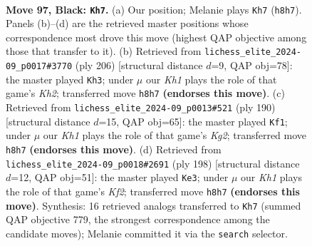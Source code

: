 \documentclass[11pt]{article}
\begin{document}
\clearpage

\begin{figure}[p]\centering
\begin{subfigure}{0.46\textwidth}\centering
\resizebox{\linewidth}{!}{%
\newchessgame
\chessboard[
  setfen={1R5k/6p1/5p2/7p/7P/6PK/2Nr4/8 b - - 19 97},
  showmover=false,
  pgfstyle=straightmove, color=movearrow, markmove={h8-h7}
]}
\caption{}
\end{subfigure}\hfill
\begin{subfigure}{0.46\textwidth}\centering
\resizebox{\linewidth}{!}{%
\newchessgame
\chessboard[
  setfen={8/5R2/6pk/7p/7P/6P1/1r5K/8 w - - 44 104},
  showmover=false,
  pgfstyle=straightmove, color=movearrow, markmove={h2-h3}
]}
\caption{}
\end{subfigure}
\\[4pt]
\begin{subfigure}{0.46\textwidth}\centering
\resizebox{\linewidth}{!}{%
\newchessgame
\chessboard[
  setfen={R7/6k1/6p1/7p/7P/5PP1/1r4K1/8 w - - 1 96},
  showmover=false,
  pgfstyle=straightmove, color=movearrow, markmove={g2-f1}
]}
\caption{}
\end{subfigure}\hfill
\begin{subfigure}{0.46\textwidth}\centering
\resizebox{\linewidth}{!}{%
\newchessgame
\chessboard[
  setfen={8/8/2R3p1/5k1p/4p2P/6P1/1r3K2/8 w - - 62 100},
  showmover=false,
  pgfstyle=straightmove, color=movearrow, markmove={f2-e3}
]}
\caption{}
\end{subfigure}
\caption{\textbf{Move 97, Black: \texttt{Kh7}.} (a) Our position; Melanie plays \texttt{Kh7} (\texttt{h8h7}). Panels (b)--(d) are the retrieved master positions whose correspondence most drove this move (highest QAP objective among those that transfer to it). (b) Retrieved from \texttt{lichess\_elite\_2024-09\_p0017\#3770} (ply 206) [structural distance $d$=9, QAP obj=78]: the master played \texttt{Kh3}; under $\mu$ our \emph{Kh1} plays the role of that game's \emph{Kh2}; transferred move \texttt{h8h7} \textbf{(endorses this move)}. (c) Retrieved from \texttt{lichess\_elite\_2024-09\_p0013\#521} (ply 190) [structural distance $d$=15, QAP obj=65]: the master played \texttt{Kf1}; under $\mu$ our \emph{Kh1} plays the role of that game's \emph{Kg2}; transferred move \texttt{h8h7} \textbf{(endorses this move)}. (d) Retrieved from \texttt{lichess\_elite\_2024-09\_p0018\#2691} (ply 198) [structural distance $d$=12, QAP obj=51]: the master played \texttt{Ke3}; under $\mu$ our \emph{Kh1} plays the role of that game's \emph{Kf2}; transferred move \texttt{h8h7} \textbf{(endorses this move)}. Synthesis: 16 retrieved analogs transferred to \texttt{Kh7} (summed QAP objective 779, the strongest correspondence among the candidate moves); Melanie committed it via the \texttt{search} selector.}
\label{fig:thought-m193}
\end{figure}
\end{document}
